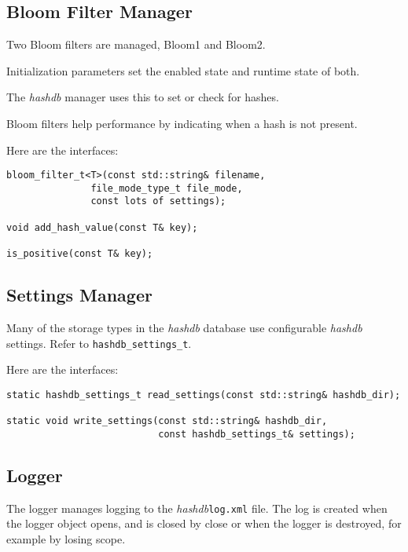 \documentclass[12pt,twoside]{article}
\newcommand{\hdb}{\emph{hashdb}\xspace}
\begin{document}
\subsection{Bloom Filter Manager}
\begin{compactitem}
\item Two Bloom filters are managed, Bloom1 and Bloom2.
\item Initialization parameters set the enabled state and runtime state of both.
\item The \hdb manager uses this to set or check for hashes.
\item Bloom filters help performance by indicating when a hash is not present.
\end{compactitem}

Here are the interfaces:

\begin{small}
\begin{verbatim}
bloom_filter_t<T>(const std::string& filename,
               file_mode_type_t file_mode,
               const lots of settings);

void add_hash_value(const T& key);

is_positive(const T& key);
\end{verbatim}
\end{small}

\subsection{Settings Manager}
Many of the storage types in the \hdb database use configurable \hdb settings.
Refer to \texttt{hashdb\_settings\_t}.

Here are the interfaces:

\begin{small}
\begin{verbatim}
static hashdb_settings_t read_settings(const std::string& hashdb_dir);

static void write_settings(const std::string& hashdb_dir,
                           const hashdb_settings_t& settings);
\end{verbatim}
\end{small}

\subsection{Logger}
The logger manages logging to the \hdb \texttt{log.xml} file.
The log is created when the logger object opens,
and is closed by close or when the logger is destroyed,
for example by losing scope.
 
\end{document}
